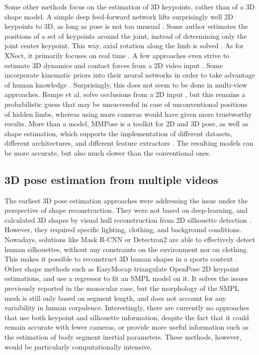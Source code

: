 Some other methods focus on the estimation of 3D keypoints, rather than of a 3D shape model. A simple deep feed-forward network lifts surprisingly well 2D keypoints to 3D, as long as pose is not too unusual \cite{Martinez2017}. Some author estimates the positions of a set of keypoints around the joint, instead of determining only the joint center keypoint. This way, axial rotation along the limb is solved \cite{Fisch2020}. As for XNect, it primarily focuses on real time \cite{Mehta2020}. A few approaches even strive to estimate 3D dynamics and contact forces from a 2D video input \cite{Li2019,Rempe2021,Louis2022}. Some incorporate kinematic priors into their neural networks in order to take advantage of human knowledge \cite{Xu2020a}. Surprisingly, this does not seem to be done in multi-view approaches. Rempe et al. solve occlusions from a 2D input \cite{Rempe2020}, but this remains a probabilistic guess that may be unsuccessful in case of unconventional positions of hidden limbs, whereas using more cameras would have given more trustworthy results. More than a model, MMPose is a toolkit for 2D and 3D pose, as well as shape estimation, which supports the implementation of different datasets, different architectures, and different feature extractors \cite{MMPose2020}. The resulting models can be more accurate, but also much slower than the conventional ones.


\subsection{3D pose estimation from multiple videos}

The earliest 3D pose estimation approaches were addressing the issue under the perspective of shape reconstruction. They were not based on deep-learning, and calculated 3D shapes by visual hull reconstruction from 2D silhouette detection \cite{Cheung2003,Corazza2006}. However, they required specific lighting, clothing, and background conditions. Nowadays, solutions like Mask R-CNN \cite{He2017} or Detectron2 \cite{Wu2019} are able to effectively detect human silhouettes, without any constraints on the environment nor on clothing. This makes it possible to reconstruct 3D human shapes in a sports context \cite{Chen2019}. Other shape methods such as EasyMocap \cite{Easymocap2021} triangulate OpenPose 2D keypoint estimations, and use a regressor to fit an SMPL model on it. It solves the issues previously reported in the monocular case, but the morphology of the SMPL mesh is still only based on segment length, and does not account for any variability in human corpulence. Interestingly, there are currently no approaches that use both keypoint and silhouette information, despite the fact that it could remain accurate with fewer cameras, or provide more useful information such as the estimation of body segment inertial parameters. These methods, however, would be particularly computationally intensive.

